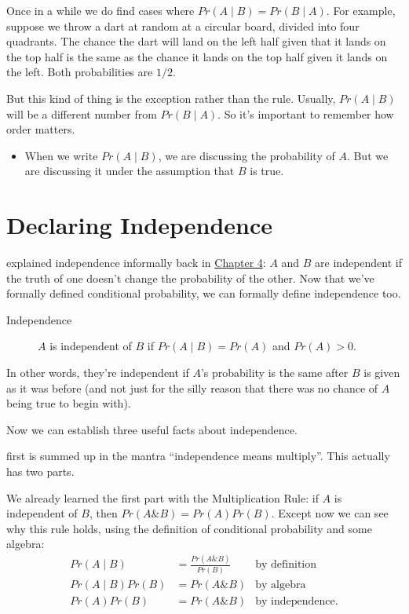 \documentclass[justified]{tufte-book}
\newcommand{\given}{\mid}
\renewcommand{\wedge}{\mathbin{\&}}
\newcommand{\p}{Pr}
\newenvironment{warning}{\begin{itemize}\item[\faBan]}{\end{itemize}}
\theoremstyle{definition}
\theoremstyle{definition}
\theoremstyle{definition}
\theoremstyle{remark}
\begin{document}
Once in a while we do find cases where \(\p(A \given B) = \p(B \given A)\). For example, suppose we throw a dart at random at a circular board, divided into four quadrants. The chance the dart will land on the left half given that it lands on the top half is the same as the chance it lands on the top half given it lands on the left. Both probabilities are \(1/2\).

But this kind of thing is the exception rather than the rule. Usually, \(\p(A \given B)\) will be a different number from \(\p(B \given A)\). So it's important to remember how order matters.

\begin{warning}
When we write \(\p(A \given B)\), we are discussing the probability of
\(A\). But we are discussing it under the assumption that \(B\) is true.
\end{warning}

\hypertarget{declaring-independence}{%
\section{Declaring Independence}\label{declaring-independence}}

 explained independence informally back in \protect\hyperlink{independence-1}{Chapter 4}: \(A\) and \(B\) are independent if the truth of one doesn't change the probability of the other. Now that we've formally defined conditional probability, we can formally define independence too.

\begin{description}
\item[Independence]
\(A\) is independent of \(B\) if \(\p(A \given B) = \p(A)\) and \(\p(A) > 0\).
\end{description}

In other words, they're independent if \(A\)'s probability is the same after \(B\) is given as it was before (and not just for the silly reason that there was no chance of \(A\) being true to begin with).

Now we can establish three useful facts about independence.

 first is summed up in the mantra ``independence means multiply''. This actually has two parts.

We already learned the first part with the Multiplication Rule: if \(A\) is independent of \(B\), then \(\p(A \wedge B) = \p(A)\p(B)\). Except now we can see why this rule holds, using the definition of conditional probability and some algebra:
\[
  \begin{aligned}
    \p(A \given B)      &= \frac{\p(A \wedge B)}{\p(B)} & \mbox{by definition}\\
    \p(A \given B)\p(B) &= \p(A \wedge B)               & \mbox{by algebra}\\
    \p(A)\p(B)          &= \p(A \wedge B)               & \mbox{by independence}.
  \end{aligned}
\]
\end{document}
